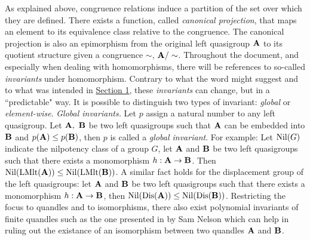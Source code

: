 As explained above, congruence relations induce a partition of the set over which they are defined. There exists a function, called \emph{canonical projection}, that maps an element to its equivalence class relative to the congruence. The canonical projection is also an epimorphism from the original left quasigroup $\mathbf{A}$ to its quotient structure given a congruence $\sim$, $\mathbf{A}/\sim$.\newline\newline
Throughout the document, and especially when dealing with homomorphisms, there will be references to so-called \emph{invariants} under homomorphism. Contrary to what the word might suggest and to what was intended in \hyperref[intro1Connected]{Section 1}, these \emph{invariants} can change, but in a ``predictable" way.\newline
It is possible to distinguish two types of invariant: \emph{global} or \emph{element-wise}.\newline\newline
\textit{Global invariants.}\newline
Let $p$ assign a natural number to any left quasigroup. Let  $\mathbf{A},~\mathbf{B}$  be two left quasigroups such that $\mathbf{A}$ can be embedded into $\mathbf{B}$ and $p(\mathbf{A})\leq p(\mathbf{B})$, then $p$ is called a \emph{global invariant}. For example:\newline
Let $\operatorname{Nil}(G)$ indicate the nilpotency class of a group $G$, let $\mathbf{A}$ and $\mathbf{B}$ be two left quasigroups such that there exists a monomorphism $h : \mathbf{A} \to \mathbf{B}$. \newline Then $\operatorname{Nil}(\operatorname{LMlt}(\mathbf{A})) \leq \operatorname{Nil}(\operatorname{LMlt}(\mathbf{B}))$. A similar fact holds for the displacement group of the left quasigroups: let $\mathbf{A}$ and $\mathbf{B}$ be two left quasigroups such that there exists a monomorphism $h : \mathbf{A} \to \mathbf{B}$, then $\operatorname{Nil}(\operatorname{Dis}(\mathbf{A})) \leq \operatorname{Nil}(\operatorname{Dis}(\mathbf{B}))$.
\newline
Restricting the focus to quandles and to isomorphisms, there also exist polynomial invariants of finite quandles such as the one presented in \cite{nelson2008polynomial} by Sam Nelson which can help in ruling out the existance of an isomorphism between two quandles $\mathbf{A}$ and $\mathbf{B}$.\newline\newline
